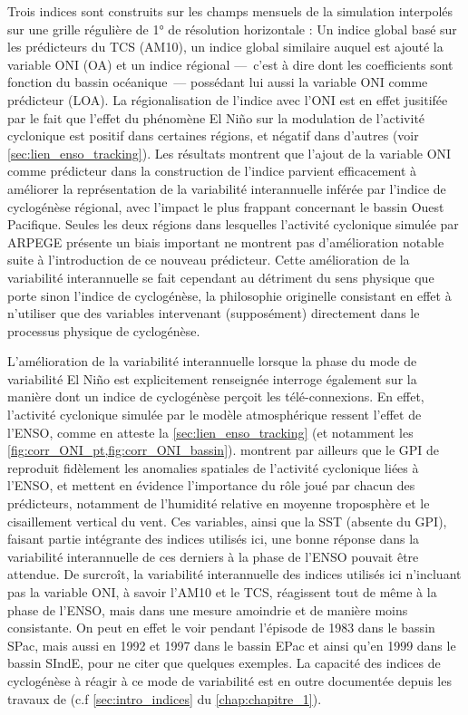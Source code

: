 \documentclass[../main.tex]{subfiles}
\begin{document}
Trois indices sont construits sur les champs mensuels de la simulation interpolés sur une grille régulière de \ang{1} de résolution horizontale : Un indice
global basé sur les prédicteurs du TCS (AM10), un indice global similaire auquel est ajouté la variable ONI (OA) et un indice régional ---~c'est à dire dont les
coefficients sont fonction du bassin océanique~--- possédant lui aussi la variable ONI comme prédicteur (LOA). La régionalisation de l'indice avec l'ONI est en
effet jusitifée par le fait que l'effet du phénomène El Niño sur la modulation de l'activité cyclonique est positif dans certaines régions, et négatif dans
d'autres (voir \cref{sec:lien_enso_tracking}). Les résultats montrent que l'ajout de la variable ONI comme prédicteur dans la construction de l'indice parvient
efficacement à améliorer la représentation de la variabilité interannuelle inférée par l'indice de cyclogénèse régional, avec l'impact le plus frappant
concernant le bassin Ouest Pacifique. Seules les deux régions dans lesquelles l'activité cyclonique simulée par ARPEGE présente un biais important ne montrent
pas d'amélioration notable suite à l'introduction de ce nouveau prédicteur. Cette amélioration de la variabilité interannuelle se fait cependant au détriment du
sens physique que porte sinon l'indice de cyclogénèse, la philosophie originelle consistant en effet à n'utiliser que des variables intervenant (supposément)
directement dans le processus physique de cyclogénèse.

L'amélioration de la variabilité interannuelle lorsque la phase du mode de variabilité El Niño est explicitement renseignée interroge également sur la manière
dont un indice de cyclogénèse perçoit les télé-connexions. En effet, l'activité cyclonique simulée par le modèle atmosphérique ressent l'effet de l'ENSO, comme
en atteste la \cref{sec:lien_enso_tracking} (et notamment les \cref{fig:corr_ONI_pt,fig:corr_ONI_bassin}). \textcite{camargo_use_2007} montrent par ailleurs que
le GPI de \textcite{emanuel_tropical_2004} reproduit fidèlement les anomalies spatiales de l'activité cyclonique liées à l'ENSO, et mettent en évidence
l'importance du rôle joué par chacun des prédicteurs, notamment de l'humidité relative en moyenne troposphère et le cisaillement vertical du vent. Ces
variables, ainsi que la SST (absente du GPI), faisant partie intégrante des indices utilisés ici, une bonne réponse dans la variabilité interannuelle de ces
derniers à la phase de l'ENSO pouvait être attendue. De surcroît, la variabilité interannuelle des indices utilisés ici n'incluant pas la variable ONI, à savoir
l'AM10 et le TCS, réagissent tout de même à la phase de l'ENSO, mais dans une mesure amoindrie et de manière moins consistante. On peut en effet le voir pendant
l'épisode de 1983 dans le bassin SPac, mais aussi en 1992 et 1997 dans le bassin EPac et ainsi qu'en 1999 dans le bassin SIndE, pour ne citer que quelques
exemples. La capacité des indices de cyclogénèse à réagir à ce mode de variabilité est en outre documentée depuis les travaux de
\textcite{watterson_seasonal_1995} (c.f \cref{sec:intro_indices} du \cref{chap:chapitre_1}).
\end{document}
